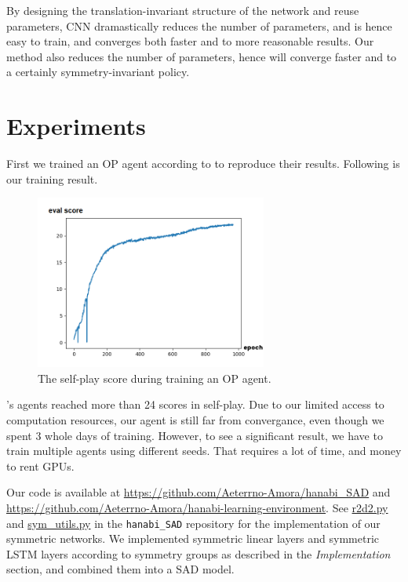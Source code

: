 \documentclass[12pt]{article}
\begin{document}
\begin{spacing}{1.15}
By designing the translation-invariant structure of the network and reuse parameters, CNN dramastically reduces the number of parameters, and is hence easy to train, and converges both faster and to more reasonable results. Our method also reduces the number of parameters, hence will converge faster and to a certainly symmetry-invariant policy.

\section{Experiments}

First we trained an OP agent according to \cite{hu2020other} to reproduce their results. Following is our training result.

\begin{figure}[H]
\centerline{\includegraphics[width=3in]{train.png}}
\caption{The self-play score during training an OP agent.}
\label{FigTrain}
\end{figure}

\cite{hu2020other}'s agents reached more than 24 scores in self-play. Due to our limited access to computation resources, our agent is still far from convergance, even though we spent 3 whole days of training. However, to see a significant result, we have to train multiple agents using different seeds. That requires a lot of time, and money to rent GPUs.

Our code is available at \url{https://github.com/Aeterrno-Amora/hanabi_SAD} and \url{https://github.com/Aeterrno-Amora/hanabi-learning-environment}. See \href{https://github.com/Aeterrno-Amora/hanabi_SAD/blob/symnet-dev/pyhanabi/r2d2.py}{r2d2.py} and \href{https://github.com/Aeterrno-Amora/hanabi_SAD/blob/symnet-dev/pyhanabi/sym_utils.py}{sym\_utils.py} in the \verb|hanabi_SAD| repository for the implementation of our symmetric networks. We implemented symmetric linear layers and symmetric LSTM layers according to symmetry groups as described in the \textsl{Implementation} section, and combined them into a SAD model.


\end{spacing}
\end{document}
